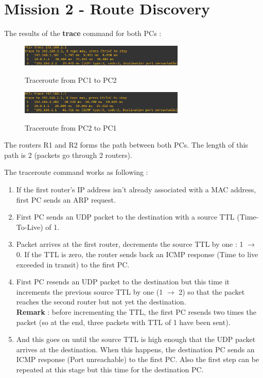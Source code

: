 \documentclass[10pt,a4paper]{ULBreport}
\begin{document}
\chapter{Mission 2 - Route Discovery}




The results of the \textbf{trace} command for both PCs :

\begin{figure}[H]
    \caption{Traceroute from PC1 to PC2}
    \center
    \includegraphics[width=0.7\textwidth]{tracePC1PC2.png}
    \label{tracepc1pc2}
\end{figure}

\begin{figure}[H]
    \caption{Traceroute from PC2 to PC1}
    \center
    \includegraphics[width=0.7\textwidth]{tracePC2PC1.png}
    \label{tracepc2pc1}
\end{figure}

The routers R1 and R2 forms the path between both PCs. The length of this path is 2 (packets go through 2 routers).




The traceroute command works as following :

\begin{enumerate}
    \item If the first router's IP address isn't already associated with a MAC address, first PC sends an ARP request.
    \item First PC sends an UDP packet to the destination with a source TTL (Time-To-Live) of 1.
    \item Packet arrives at the first router, decrements the source TTL by one : 1 $\rightarrow$ 0. If the TTL is zero, the router sends back an ICMP response (Time to live exceeded in transit) to the first PC.
    \item First PC resends an UDP packet to the destination but this time it increments the previous source TTL by one (1 $\rightarrow$ 2) so that the packet reaches the second router but not yet the destination. 
    \\ \textbf{Remark} : before incrementing the TTL, the first PC resends two times the packet (so at the end, three packets with TTL of 1 have been sent).
    \item And this goes on until the source TTL is high enough that the UDP packet arrives at the destination. When this happens, the destination PC sends an ICMP response (Port unreachable) to the first PC. Also the first step can be repeated at this stage but this time for the destination PC.
\end{enumerate}
\end{document}
